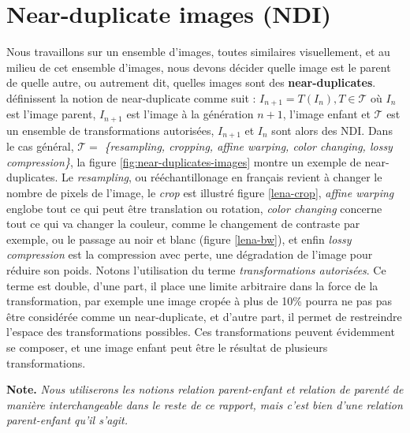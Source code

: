 \documentclass[utf8]{stageM2R} %
\begin{document}
\section{Near-duplicate images (NDI)}
\label{subsec:ndi}
Nous travaillons sur un ensemble d'images, toutes similaires visuellement, et au milieu de cet ensemble d'images, nous devons décider quelle image est le parent de quelle autre, ou autrement dit, quelles images sont des \textbf{near-duplicates}. \citeauthor{joly2007content} \cite{joly2007content} définissent la notion de near-duplicate comme suit : $I_{n+1} = T(I_{n}), T \in \mathcal{T}$ où $I_{n}$ est l'image parent, $I_{n+1}$ est l'image à la génération $n+1$, l'image enfant et $\mathcal{T}$ est un ensemble de transformations autorisées, $I_{n+1}$ et $I_{n}$ sont alors des NDI. Dans le cas général, $\mathcal{T} = $ \textit{\{resampling, cropping, affine warping, color changing, lossy compression\}}, la figure \ref{fig:near-duplicates-images} montre un exemple de near-duplicates. Le \textit{resampling}, ou rééchantillonage en français revient à changer le nombre de pixels de l'image, le \textit{crop} est illustré figure \ref{lena-crop}, \textit{affine warping} englobe tout ce qui peut être translation ou rotation, \textit{color changing} concerne tout ce qui va changer la couleur, comme le changement de contraste par exemple, ou le passage au noir et blanc (figure \ref{lena-bw}), et enfin \textit{lossy compression} est la compression avec perte, une dégradation de l'image pour réduire son poids.
Notons l'utilisation du terme \textit{transformations autorisées}. Ce terme est double, d'une part, il place une limite arbitraire dans la force de la transformation, par exemple une image cropée à plus de 10\% pourra ne pas pas être considérée comme un near-duplicate, et d'autre part, il permet de restreindre l'espace des transformations possibles. 
Ces transformations peuvent évidemment se composer, et une image enfant peut être le résultat de plusieurs transformations.


\vspace{5mm}
\textbf{Note.} \textit{Nous utiliserons les notions relation parent-enfant et relation de parenté de manière interchangeable dans le reste de ce rapport, mais c'est bien d'une relation parent-enfant qu'il s'agit.}
\end{document}
